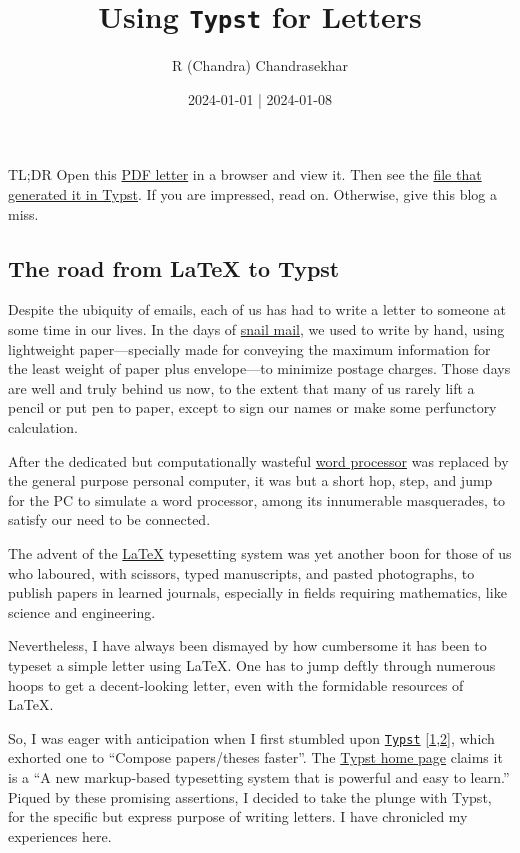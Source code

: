 \documentclass[
  a4paper,
]{article}
\title{Using \texttt{Typst} for Letters}
\author{R (Chandra) Chandrasekhar}
\date{2024-01-01 | 2024-01-08}
\begin{document}
\maketitle

\thispagestyle{empty}


TL;DR Open this \href{auxiliary/letter.pdf}{PDF letter} in a browser and
view it. Then see the \href{auxiliary/letter.typ}{file that generated it
in Typst}. If you are impressed, read on. Otherwise, give this blog a
miss.

\hypertarget{the-road-from-latex-to-typst}{%
\subsection{The road from LaTeX to
Typst}\label{the-road-from-latex-to-typst}}

Despite the ubiquity of emails, each of us has had to write a letter to
someone at some time in our lives. In the days of
\href{https://www.merriam-webster.com/dictionary/snail\%20mail}{snail
mail}, we used to write by hand, using lightweight paper---specially
made for conveying the maximum information for the least weight of paper
plus envelope---to minimize postage charges. Those days are well and
truly behind us now, to the extent that many of us rarely lift a pencil
or put pen to paper, except to sign our names or make some perfunctory
calculation.

After the dedicated but computationally wasteful
\href{https://www.webopedia.com/definitions/word-processor/}{word
processor} was replaced by the general purpose personal computer, it was
but a short hop, step, and jump for the PC to simulate a word processor,
among its innumerable masquerades, to satisfy our need to be connected.

The advent of the \href{https://www.latex-project.org/}{LaTeX}
typesetting system was yet another boon for those of us who laboured,
with scissors, typed manuscripts, and pasted photographs, to publish
papers in learned journals, especially in fields requiring mathematics,
like science and engineering.

Nevertheless, I have always been dismayed by how cumbersome it has been
to typeset a simple letter using LaTeX. One has to jump deftly through
numerous hoops to get a decent-looking letter, even with the formidable
resources of LaTeX.

So, I was eager with anticipation when I first stumbled upon
\href{https://typst.app/}{\texttt{Typst}}
{[}\protect\hyperlink{ref-typst01}{1},\protect\hyperlink{ref-typst02}{2}{]},
which exhorted one to ``Compose papers/theses faster''. The
\href{https://github.com/typst/typst}{Typst home page} claims it is a
``A new markup-based typesetting system that is powerful and easy to
learn.'' Piqued by these promising assertions, I decided to take the
plunge with Typst, for the specific but express purpose of writing
letters. I have chronicled my experiences here.
\end{document}
